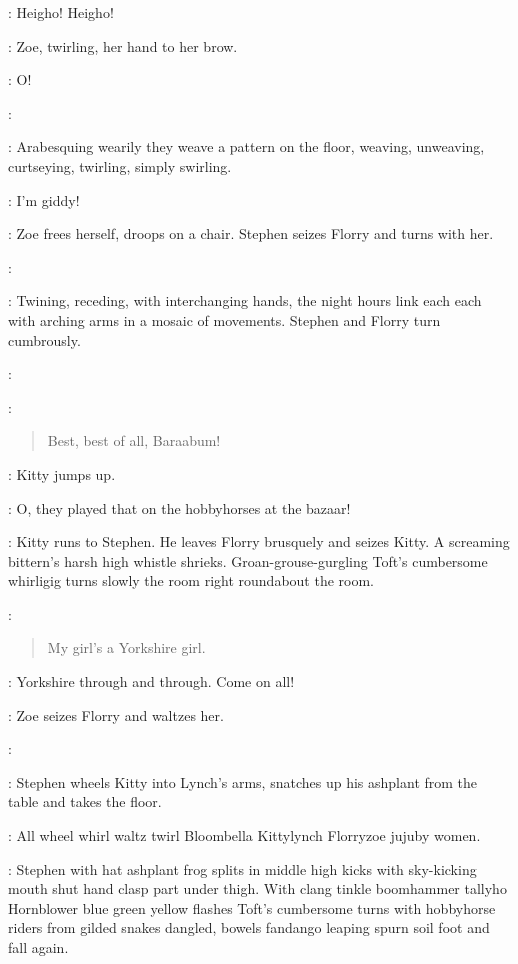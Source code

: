 \Bracelets:
Heigho!
Heigho!

:
Zoe, twirling, her hand to her brow.

\Zoe:
O!

\Maginni:

:
Arabesquing wearily they weave a pattern on the floor, weaving,
unweaving, curtseying, twirling, simply swirling.

\Zoe:
I'm giddy!

:
Zoe frees herself, droops on a chair.
Stephen seizes Florry and turns with her.

\Maginni:

:
Twining, receding, with interchanging hands, the night hours
link each each with arching arms in a mosaic of movements.
Stephen and Florry turn cumbrously.

\Maginni:

\Pianola[2]:
\begin{verse}
    Best, best of all,
    Baraabum!
\end{verse}

:
Kitty jumps up.

\Kitty:
O, they played that on the hobbyhorses at the  bazaar!

:
Kitty runs to Stephen.
He leaves Florry brusquely and seizes Kitty.
A screaming bittern's harsh high whistle shrieks.
Groan-grouse-gurgling Toft's cumbersome whirligig turns slowly
the room right roundabout the room.

\Pianola:
\begin{verse}
    My girl's a Yorkshire girl.
\end{verse}

\Zoe:
Yorkshire through and through.
Come on all!

:
Zoe seizes Florry and waltzes her.

\Stephen:

:
Stephen wheels Kitty into Lynch's arms,
snatches up his ashplant from the table and takes the floor.

:
All wheel whirl waltz twirl
Bloombella Kittylynch Florryzoe jujuby women.

:
Stephen with hat ashplant frog splits in middle high kicks
with sky-kicking mouth shut hand clasp part under thigh.
With clang tinkle boomhammer tallyho Hornblower blue green yellow
flashes Toft's cumbersome turns with hobbyhorse riders from gilded snakes dangled,
bowels fandango leaping spurn soil foot and fall again.

